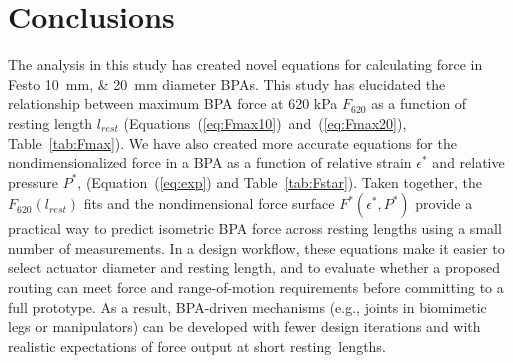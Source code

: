 \documentclass[actuators,article,accept,pdftex,moreauthors]{Definitions/mdpi}
\begin{document}
\section{Conclusions}


The analysis in this study has created novel equations for calculating force in Festo \qtylist{10;20}{\mm} diameter BPAs. This study has elucidated the relationship between maximum BPA force at 620 kPa $F_{620}$ as a function of resting length $l_{rest}$ (\mbox{Equations~(\ref{eq:Fmax10}) and~(\ref{eq:Fmax20}),} Table~\ref{tab:Fmax}). We have also created more accurate equations for the nondimensionalized force in a BPA as a function of relative strain $\epsilon^*$ and relative pressure $P^*$, (Equation~(\ref{eq:exp}) and \mbox{Table~\ref{tab:Fstar}}). Taken together, the $F_{620}(l_{rest})$ fits and the nondimensional force surface $F^*(\epsilon^*,P^*)$ provide a practical way to predict isometric BPA force across resting lengths using a small number of measurements. In a design workflow, these equations make it easier to select actuator diameter and resting length, and to evaluate whether a proposed routing can meet force and range-of-motion requirements before committing to a full prototype. As a result, BPA-driven mechanisms (e.g., joints in biomimetic legs or manipulators) can be developed with fewer design iterations and with realistic expectations of force output at short \mbox{resting lengths.}



\vspace{6pt} 



\end{document}

